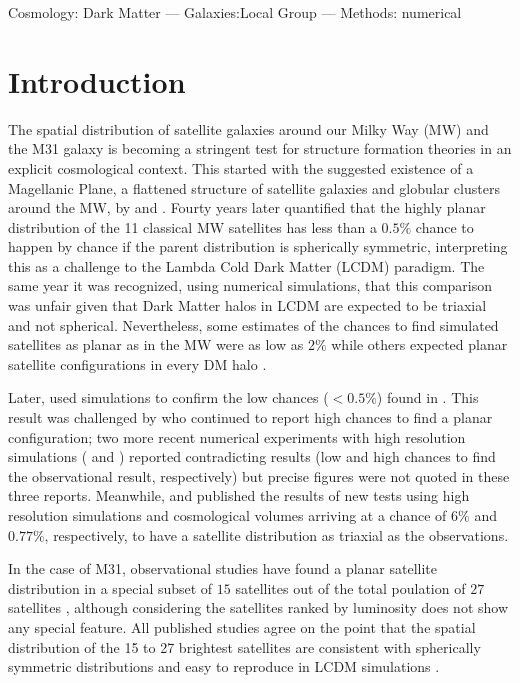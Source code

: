 \documentclass[a4paper,fleqn,usenatbib]{mnras}
\begin{document}
\begin{keywords}Cosmology: Dark Matter --- Galaxies:Local Group ---
  Methods: numerical  
\end{keywords}

\section{Introduction}

The spatial distribution of satellite galaxies around our Milky Way
(MW) and the M31 galaxy is becoming a stringent test for structure
formation theories in an explicit cosmological context. 
This started with the suggested existence of a Magellanic Plane, a flattened
structure of satellite galaxies and globular clusters around the MW,
by \cite{1976RGOB..182..241K} and \cite{1976MNRAS.174..695L}.  
Fourty years later \cite{2005A&A...431..517K} quantified that the
highly planar distribution of the 11 classical MW satellites has less
than a $0.5\%$ chance to happen by chance if the
parent distribution is spherically symmetric, interpreting this as a
challenge to the Lambda Cold Dark Matter (LCDM) paradigm.
The same year it was recognized, using numerical simulations, that
this comparison was unfair given that Dark Matter halos in LCDM
are expected to be triaxial and not spherical.
Nevertheless, some estimates of the chances to find simulated satellites as
planar as in the MW 
were as low as $2\%$ \citep{2005ApJ...629..219Z} while others expected
planar satellite configurations in every DM halo
\citep{2005MNRAS.363..146L}.

Later, \cite{2007MNRAS.374.1125M} used simulations to confirm the low
chances ($<0.5\%$) found in \cite{2005A&A...431..517K}.
This result was challenged by \cite{2009MNRAS.399..550L} who continued
to report high chances to find a planar configuration;
two more recent numerical experiments with high resolution simulations
(\cite{2013MNRAS.429..725S} and \cite{2016MNRAS.457.1931S}) reported
contradicting results (low and high chances to find the observational
result, respectively) but precise figures were not quoted in these three reports. 
Meanwhile, \cite{2013MNRAS.429.1502W} and \cite{2014ApJ...789L..24P} published
the results of new tests using high resolution simulations and cosmological
volumes arriving at a chance of $6\%$ and $0.77\%$, respectively, to
have a satellite distribution as triaxial as the observations. 


In the case of M31, observational studies have found a planar satellite
distribution in a special subset of $15$ satellites out of the 
total poulation of $27$ satellites \citep{2013ApJ...766..120C,
2013Natur.493...62I}, although considering the satellites ranked by
luminosity does not show any special feature.
All published studies agree on the point that the spatial distribution of
the 15 to 27 brightest satellites are consistent with spherically
symmetric distributions and easy to reproduce in LCDM simulations
\citep{2006AJ....131.1405K,2007MNRAS.374.1125M, 2013ApJ...766..120C}.
\end{document}
